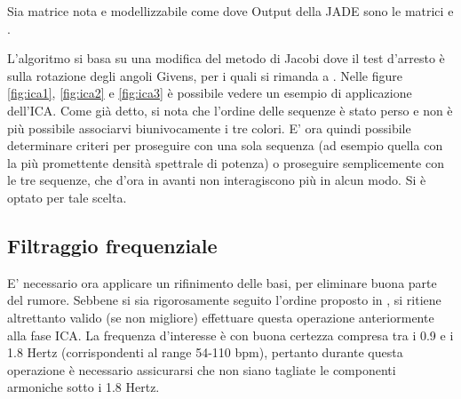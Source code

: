 Sia  matrice nota e modellizzabile come  dove 
Output della JADE sono le matrici  e  \cite{CARD}.

L'algoritmo si basa su una modifica del metodo di Jacobi dove il test d'arresto è sulla rotazione degli angoli Givens, per i quali si rimanda a \cite{GIV}. Nelle figure \ref{fig:ica1}, \ref{fig:ica2} e \ref{fig:ica3} è possibile vedere un esempio di applicazione dell'ICA.
Come già detto, si nota che l'ordine delle sequenze è stato perso e non è più possibile associarvi biunivocamente i tre colori. E' ora quindi possibile determinare criteri per proseguire con una sola sequenza (ad esempio quella con la più promettente densità spettrale di potenza) o proseguire semplicemente con le tre sequenze, che d'ora in avanti non interagiscono più in alcun modo. Si è optato per tale scelta.
	\subsection{Filtraggio frequenziale}
E' necessario ora applicare un rifinimento delle basi, per eliminare buona parte del rumore. Sebbene si sia rigorosamente seguito l'ordine proposto in \cite{POH11}, si ritiene altrettanto valido (se non migliore) effettuare questa operazione anteriormente alla fase ICA.  La frequenza d'interesse è con buona certezza compresa tra i 0.9 e i 1.8 Hertz (corrispondenti al range 54-110 bpm), pertanto durante questa operazione è necessario assicurarsi che non siano tagliate le componenti armoniche sotto i 1.8 Hertz.
